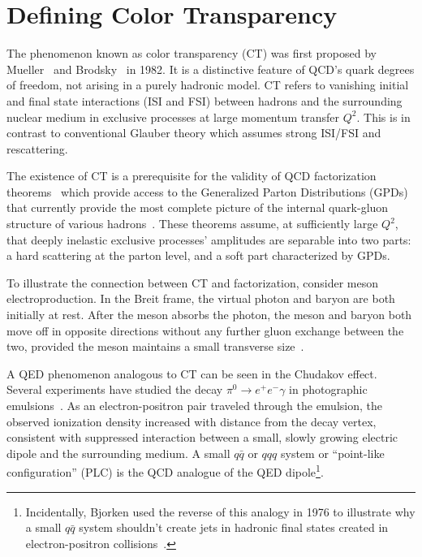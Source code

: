 \section{Defining Color Transparency}\label{sec:ct_def}
The phenomenon known as color transparency (CT) was first proposed by
Mueller~\cite{Mueller_1982} and Brodsky~\cite{Brodsky_1982} in 1982.
It is a distinctive feature of QCD's quark degrees of freedom, not arising in a
purely hadronic model.
CT refers to vanishing initial and final state interactions (ISI and FSI)
between hadrons and the surrounding nuclear medium in exclusive processes
at large momentum transfer $Q^2$.
This is in contrast to conventional Glauber theory which assumes strong ISI/FSI
and rescattering.


The existence of CT is a prerequisite for the validity of QCD factorization
theorems~\cite{Brodsky_1994, Collins_1997, Frankfurt_1999, Diehl_1998,
Strikman_2000} which provide access to the Generalized Parton Distributions
(GPDs) that currently provide the most complete picture of the internal
quark-gluon structure of various hadrons~\cite{Ji_1997_Jan, Ji_1997_Jun,
Radyushkin_1996, Radyushkin_1997}.
These theorems assume, at sufficiently large $Q^2$, that deeply inelastic
exclusive processes' amplitudes are separable into two parts: a hard scattering
at the parton level, and a soft part characterized by GPDs.


To illustrate the connection between CT and factorization, consider
meson electroproduction.
In the Breit frame, the virtual photon and baryon are both initially at rest.
After the meson absorbs the photon, the meson and baryon both move off in
opposite directions without any further gluon exchange between the two,
provided the meson maintains a small transverse size~\cite{Strikman_2000}.


A QED phenomenon analogous to CT can be seen in the Chudakov effect.
Several experiments have studied the decay $\pi^0 \rightarrow e^+ e^- \gamma$
in photographic emulsions~\cite{Perkins_1955, Fowler_1955, Wolter_1956,
Iwadare_1958, Varfolomeev_1959, Zielinski_1985}.
As an electron-positron pair traveled through the emulsion,
the observed ionization density increased with distance from the decay vertex,
consistent with suppressed interaction between a
small, slowly growing electric dipole and the surrounding medium.
A small $q\bar{q}$ or $qqq$ system or ``point-like configuration'' (PLC) is the
QCD analogue of the QED dipole\footnote{Incidentally, Bjorken used
the reverse of this analogy in 1976 to illustrate why a small
$q\bar{q}$ system shouldn't create jets in hadronic final
states created in electron-positron collisions~\cite{Bjorken_1976}.}.


